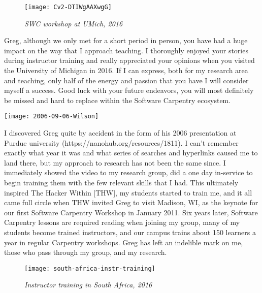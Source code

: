 \begin{figure}[h!]
\begin{center}
\texttt{[image: Cv2-DTIWgAAXwgG]}
    \caption*{\textit{SWC workshop at UMich, 2016}}
\end{center}
\end{figure}

Greg, although we only met for a short period in person, you have had a huge
impact on the way that I approach teaching.  I thoroughly enjoyed your stories
during instructor training and really appreciated your opinions when you
visited the University of Michigan in 2016.  If I can express, both for my
research area and teaching, only half of the energy and passion that you have I
will consider myself a success.  Good luck with your future endeavors, you will
most definitely be missed and hard to replace within the Software Carpentry
ecosystem.     


\newpage

\begin{center}
\texttt{[image: 2006-09-06-Wilson]}
\end{center}

I discovered Greg quite by accident in the form of his 2006 presentation at
Purdue university (https://nanohub.org/resources/1811).  I can't remember
exactly what year it was and what series of searches and hyperlinks caused me
to land there, but my approach to research has not been the same since.  I
immediately showed the video to my research group, did a one day in-service to
begin training them with the few relevant skills that I had.  This ultimately
inspired The Hacker Within [THW], my students started to train me, and it all
came full circle when THW invited Greg to visit Madison, WI, as the keynote for
our first Software Carpentry Workshop in January 2011. Six years later,
Software Carpentry lessons are required reading when joining my group, many of
my students become trained instructors, and our campus trains about 150
learners a year in regular Carpentry workshops.  Greg has left an indelible
mark on me, those who pass through my group, and my research.


\newpage
\vspace*{\fill}
\begin{figure}[h!]
\begin{center}
\texttt{[image: south-africa-instr-training]}
\caption*{\textit{Instructor training in South Africa, 2016}}
\end{center}
\end{figure}


